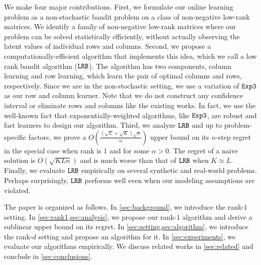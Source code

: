 We make four major contributions. First, we formulate our online learning problem as a non-stochastic bandit problem on a class of non-negative low-rank matrices. We identify a family of non-negative low-rank matrices where our problem can be solved statistically efficiently, without actually observing the latent values of individual rows and columns. Second, we propose a computationally-efficient algorithm that implements this idea, which we call a low rank bandit algorithm (${\tt LRB}$). The algorithm has two components, column learning and row learning, which learn the pair of optimal columns and rows, respectively. Since we are in the non-stochastic setting, we use a variation of ${\tt Exp3}$ \citep{auer2002nonstochastic} as our row and column learner. Note that we do not construct any confidence interval or eliminate rows and columns like the existing works. In fact, we use the well-known fact that exponentially-weighted algorithms, like ${\tt Exp3}$, are robust and fast learners to design our algorithm. Third, we analyze ${\tt LRB}$ and up to problem-specific factors, we prove a $O\left(\frac{\left(\sqrt{L } + \sqrt{K }\right)\sqrt{n}}{\alpha}\right)$ upper bound on its $n$-step regret in the special case when rank is $1$ and for some $\alpha > 0$. The regret of a naive solution is $O(\sqrt{K L n})$ and is much worse than that of ${\tt LRB}$ when $K \approx L$. Finally, we evaluate ${\tt LRB}$ empirically on several synthetic and real-world problems. Perhaps surprisingly, ${\tt LRB}$ performs well even when our modeling assumptions are violated.

The paper is organized as follows. In \cref{sec:background}, we introduce the rank-$1$ setting. In \cref{sec:rank1,sec:analysis}, we propose our rank-$1$ algorithm and derive a sublinear upper bound on its regret. In \cref{sec:setting,sec:algorithm}, we introduce the rank-$d$ setting and propose an algorithm for it. In \cref{sec:experiments}, we evaluate our algorithms empirically. We discuss related works in \cref{sec:related} and conclude in \cref{sec:conclusions}. 